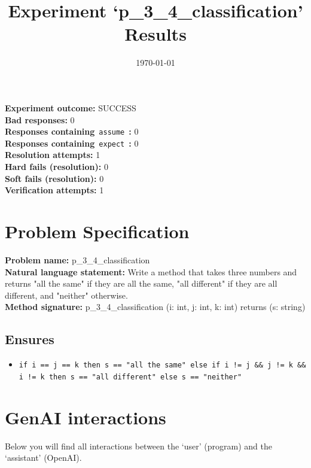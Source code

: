 \documentclass{article}
\begin{document}
\title{Experiment `p\_3\_4\_classification' Results}
\author{\today}
\date{}
\maketitle
\textbf{Experiment outcome: }SUCCESS
\\\textbf{Bad responses: }0
\\\textbf{Responses containing}~\texttt{assume}~\textbf{: }0
\\\textbf{Responses containing}~\texttt{expect}~\textbf{: }0
\\\textbf{Resolution attempts: }1
\\\textbf{Hard fails (resolution): }0
\\\textbf{Soft fails (resolution): }0
\\\textbf{Verification attempts: }1
\section*{Problem Specification}
\textbf{Problem name: }p\_3\_4\_classification
\\\textbf{Natural language statement: }Write a method that takes three numbers and returns "all the same" if they are all the same, "all different" if they are all different, and "neither" otherwise.
\\\textbf{Method signature: }p\_3\_4\_classification (i: int, j: int, k: int) returns (s: string)
\subsection*{Ensures}
\begin{itemize}
\item \texttt{if i == j == k then s == "all the same" else if i != j \&\& j != k \&\& i != k then s == "all different" else s == "neither"}
\end{itemize}
\clearpage
\section*{GenAI interactions}
Below you will find all interactions between the `user' (program) and the `assistant' (OpenAI).
\end{document}
